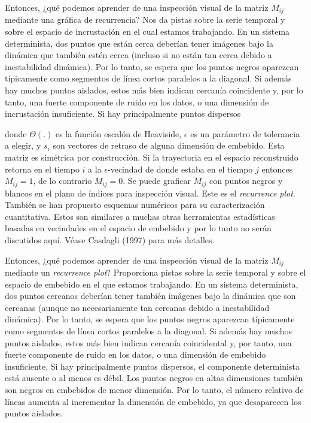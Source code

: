 \documentclass[10pt,a4paper]{book}
\begin{document}
Entonces, ¿qué podemos aprender de una inspección visual de la matriz $M_{ij}$ mediante una gráfica de recurrencia? Nos da pistas sobre la serie temporal y sobre el espacio de incrustación en el cual estamos trabajando. En un sistema determinista, dos puntos que están cerca deberían tener imágenes bajo la dinámica que también estén cerca (incluso si no están tan cerca debido a inestabilidad dinámica). Por lo tanto, se espera que los puntos negros aparezcan típicamente como segmentos de línea cortos paralelos a la diagonal. Si además hay muchos puntos aislados, estos más bien indican cercanía coincidente y, por lo tanto, una fuerte componente de ruido en los datos, o una dimensión de incrustación insuficiente. Si hay principalmente puntos dispersos

donde $\Theta(.)$ es la función escalón de Heaviside, $\epsilon$ es un parámetro de tolerancia a elegir, y $s_i$ son vectores de retraso de alguna dimensión de embebido. Esta matriz es simétrica por construcción. Si la trayectoria en el espacio reconstruido retorna en el tiempo $i$ a la $\epsilon$-vecindad de donde estaba en el tiempo $j$ entonces $M_{ij} = 1$, de lo contrario $M_{ij} = 0$. Se puede graficar $M_{ij}$ con puntos negros y blancos en el plano de índices para inspección visual. Este es el \textit{recurrence plot}. También se han propuesto esquemas numéricos para su caracterización cuantitativa. Estos son similares a muchas otras herramientas estadísticas basadas en vecindades en el espacio de embebido y por lo tanto no serán discutidos aquí. Véase Casdagli (1997) para más detalles.

Entonces, ¿qué podemos aprender de una inspección visual de la matriz $M_{ij}$ mediante un \textit{recurrence plot}? Proporciona pistas sobre la serie temporal y sobre el espacio de embebido en el que estamos trabajando. En un sistema determinista, dos puntos cercanos deberían tener también imágenes bajo la dinámica que son cercanas (aunque no necesariamente tan cercanas debido a inestabilidad dinámica). Por lo tanto, se espera que los puntos negros aparezcan típicamente como segmentos de línea cortos paralelos a la diagonal. Si además hay muchos puntos aislados, estos más bien indican cercanía coincidental y, por tanto, una fuerte componente de ruido en los datos, o una dimensión de embebido insuficiente. Si hay principalmente puntos dispersos, el componente determinista está ausente o al menos es débil. Los puntos negros en altas dimensiones también son negros en embebidos de menor dimensión. Por lo tanto, el número relativo de líneas aumenta al incrementar la dimensión de embebido, ya que desaparecen los puntos aislados.
\end{document}
